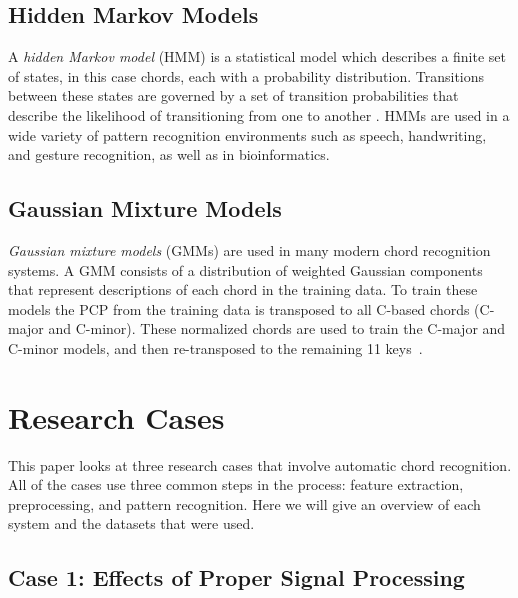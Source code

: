 \documentclass{sig-alternate}
\begin{document}

\subsection{Hidden Markov Models}\label{main} 

A \textit{hidden Markov model} (HMM) is a statistical model which describes a finite set of states, in this case chords, each with a probability distribution. Transitions between these states are governed by a set of transition probabilities that describe the likelihood of transitioning from one to another \cite{TaeMin:2014}. HMMs are used in a wide variety of pattern recognition environments such as speech, handwriting, and gesture recognition, as well as in bioinformatics. 


\subsection{Gaussian Mixture Models}

\textit{Gaussian mixture models} (GMMs) are used in many modern chord recognition systems. A GMM consists of a distribution of weighted Gaussian components that represent descriptions of each chord in the training data. To train these models the PCP from the training data is transposed to all C-based chords (C-major and C-minor). These normalized chords are used to train the C-major and C-minor models, and then re-transposed to the remaining 11 keys~\cite{TaeMin:2014}.


\section{Research Cases}

This paper looks at three research cases that involve automatic chord recognition. All of the cases use three common steps in the process: feature extraction, preprocessing, and pattern recognition. Here we will give an overview of each system and the datasets that were used.

\subsection{Case 1: Effects of Proper Signal Processing}
\end{document}
